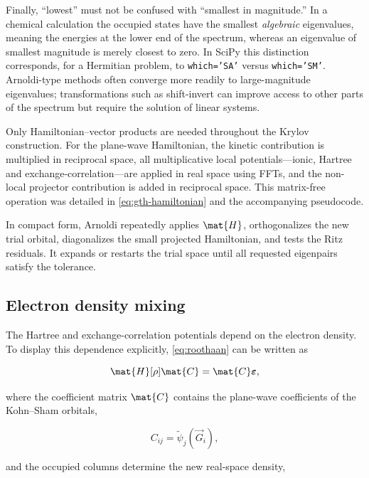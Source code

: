Finally, ``lowest'' must not be confused with ``smallest in magnitude.'' In a chemical calculation the occupied states have the smallest \emph{algebraic} eigenvalues, meaning the energies at the lower end of the spectrum, whereas an eigenvalue of smallest magnitude is merely closest to zero. In SciPy this distinction corresponds, for a Hermitian problem, to \texttt{which='SA'} versus \texttt{which='SM'}. Arnoldi-type methods often converge more readily to large-magnitude eigenvalues; transformations such as shift-invert can improve access to other parts of the spectrum but require the solution of linear systems.\cite{lanczos_scipy}

Only Hamiltonian--vector products are needed throughout the Krylov construction. For the plane-wave Hamiltonian, the kinetic contribution is multiplied in reciprocal space, all multiplicative local potentials---ionic, Hartree and exchange-correlation---are applied in real space using FFTs, and the non-local projector contribution is added in reciprocal space. This matrix-free operation was detailed in \cref{eq:gth-hamiltonian} and the accompanying pseudocode.

In compact form, Arnoldi repeatedly applies \(\mat{H}\), orthogonalizes the new trial orbital, diagonalizes the small projected Hamiltonian, and tests the Ritz residuals. It expands or restarts the trial space until all requested eigenpairs satisfy the tolerance.

%
%
%
\subsection{Electron density mixing}

The Hartree and exchange-correlation potentials depend on the electron density. To display this dependence explicitly, \cref{eq:roothaan} can be written as

\begin{equation}
    \mat{H}[\rho]\mat{C} = \mat{C}\boldsymbol{\varepsilon},
    \label{eq:roothaan_explicit}
\end{equation}

where the coefficient matrix \(\mat{C}\) contains the plane-wave coefficients of the Kohn--Sham orbitals,

\begin{equation}
    C_{ij} = \tilde{\psi}_{j}(\vec{G}_{i}),
\end{equation}

and the occupied columns determine the new real-space density,

